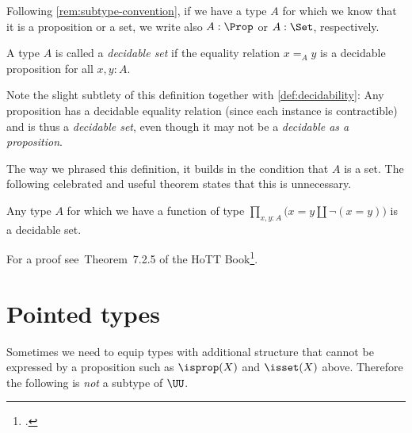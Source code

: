 Following \cref{rem:subtype-convention},
if we have a type $A$ for which we know that it is a proposition or a set,
we write also $A : \Prop$ or $A : \Set$, respectively.

\begin{definition}\label{def:decidable-set}
  A type $A$ is called a \emph{decidable set} if the equality relation $x=_A y$
  is a decidable proposition for all $x,y:A$.
\end{definition}
Note the slight subtlety of this definition together with
\cref{def:decidability}: Any proposition has a decidable equality relation
(since each instance is contractible) and is thus a \emph{decidable set},
even though it may not be a \emph{decidable as a proposition}.

The way we phrased this definition, it builds in the condition that $A$ is a set.
The following celebrated and useful theorem states that this is unnecessary.
\begin{theorem}[Hedberg]\label{thm:hedberg}
  Any type $A$ for which we have a function of type
  $\prod_{x,y:A}\bigl(x=y \coprod \lnot(x=y)\bigr)$
  is a decidable set.
\end{theorem}
For a proof see~Theorem~7.2.5 of the HoTT Book\footcite{hottbook}.

\section{Pointed types}\label{sec:pointedtypes}
Sometimes we need to equip types with additional structure
that cannot be expressed by a proposition such as
$\isprop(X)$ and $\isset(X)$ above.
Therefore the following is \emph{not} a subtype of $\UU$.

